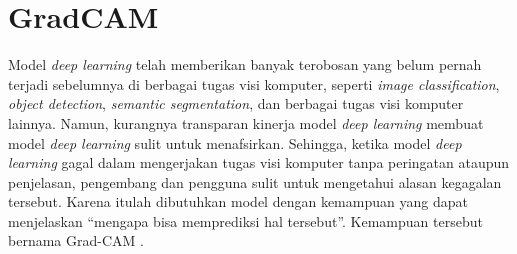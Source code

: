 \section{GradCAM}
\label{sec:gradcam}

Model \emph{deep learning} telah memberikan banyak terobosan yang belum pernah terjadi \linebreak sebelumnya di berbagai tugas visi komputer, seperti \emph{image classification}, \emph{object detection}, \emph{semantic segmentation}, 
dan berbagai tugas visi komputer lainnya. Namun, kurangnya transparan kinerja model \emph{deep learning} membuat model \emph{deep learning} 
sulit untuk menafsirkan. Sehingga, ketika model \emph{deep learning} gagal dalam mengerjakan tugas visi komputer tanpa peringatan ataupun penjelasan, pengembang dan pengguna 
sulit untuk mengetahui alasan kegagalan tersebut. Karena itulah dibutuhkan model dengan kemampuan yang dapat menjelaskan “mengapa bisa memprediksi hal tersebut”. Kemampuan 
tersebut bernama Grad-CAM \parencite{Selvaraju2019}.

